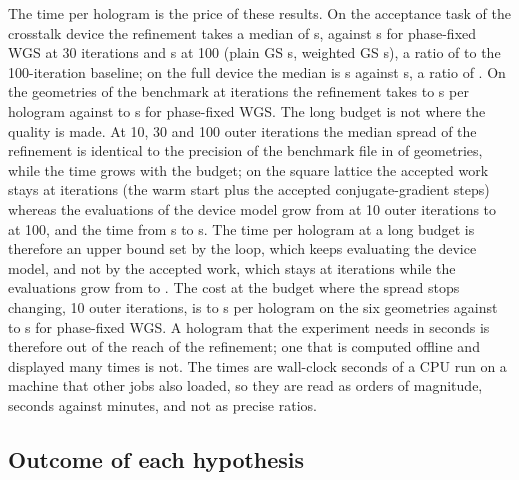 The time per hologram is the price of these results. On the acceptance task of the crosstalk device the refinement takes a median of \secBXMedian{} s, against \secMsevenThirty{} s for phase-fixed WGS at 30 iterations and \secMXSevenHundred{} s at 100 (plain GS \secMfourThirty{} s, weighted GS \secMsixThirty{} s), a ratio of \timeRatioX{} to the 100-iteration baseline; on the full device the median is \secBFMedian{} s against \secMFSevenHundred{} s, a ratio of \timeRatioF{}. On the geometries of the benchmark at \benchOneBudget{} iterations the refinement takes \benchHundredSecRefMin{} to \benchHundredSecRefMax{} s per hologram against \benchHundredSecMsevenMin{} to \benchHundredSecMsevenMax{} s for phase-fixed WGS. The long budget is not where the quality is made. At 10, 30 and 100 outer iterations the median spread of the refinement is identical to the precision of the benchmark file in \benchBudgetSameCells{} of \benchBudgetCells{} geometries, while the time grows with the budget; on the square lattice the accepted work stays at \benchGOneIters{} iterations (the warm start plus the accepted conjugate-gradient steps) whereas the evaluations of the device model grow from \benchGOneEvalTen{} at 10 outer iterations to \benchGOneEvalHundred{} at 100, and the time from \benchGOneSecTen{} s to \benchGOneSecHundred{} s. The time per hologram at a long budget is therefore an upper bound set by the loop, which keeps evaluating the device model, and not by the accepted work, which stays at \benchGOneIters{} iterations while the evaluations grow from \benchGOneEvalTen{} to \benchGOneEvalHundred{}. The cost at the budget where the spread stops changing, 10 outer iterations, is \benchTenSecRefMin{} to \benchTenSecRefMax{} s per hologram on the six geometries against \benchTenSecMsevenMin{} to \benchTenSecMsevenMax{} s for phase-fixed WGS. A hologram that the experiment needs in seconds is therefore out of the reach of the refinement; one that is computed offline and displayed many times is not. The times are wall-clock seconds of a CPU run on a machine that other jobs also loaded, so they are read as orders of magnitude, seconds against minutes, and not as precise ratios.

\subsection{Outcome of each hypothesis}

